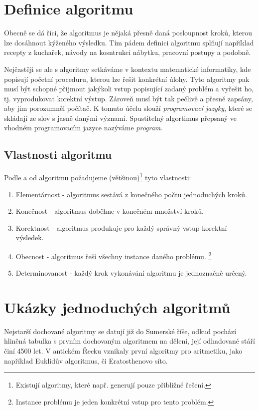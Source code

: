 \documentclass[12pt]{report}			%
\begin{document}
			\section{Definice algoritmu}
			Obecně se dá říci, že algoritmus je nějaká přesně daná posloupnost kroků, kterou lze dosáhnout kýženého výsledku. Tím pádem definici algoritmu splňují například recepty z kuchařek, návody na kosntrukci nábytku, pracovní postupy a podobně. \cite{neckar}
			
			
			Nejčastěji se ale s algoritmy setkáváme v kontextu matematické informatiky, kde popisují početní proceduru, kterou lze řešit konkrétní úlohy. Tyto algoritmy pak musí být schopné přijmout jakýkoli vstup popisující zadaný problém a vyřešit ho, tj. vyprodukovat korektní výstup. Zároveň musí být tak pečlivě a přesně zapsány, aby jim porozumněl počítač. K tomuto účelu slouží \emph{programovací jazyky}, které se skládají ze slov s jasně danými význami. Spustitelný algortimus přepsaný ve vhodném programovacím jazyce nazýváme \emph{program}. \cite{dvorsky} 
			
			\subsection{Vlastnosti algoritmu}
			Podle \cite{zaklady} a \cite{cerny} od algoritmu požadujeme (většinou)\footnote{Existují algoritmy, které např. generují pouze přibližné řešení.} tyto vlastnosti:
			\begin{enumerate}
				\item Elementárnost - algoritmus sestává z konečného počtu jednoduchých kroků.
				\item Konečnost - algoritmus doběhne v konečném množství kroků.
				\item Korektnost - algoritmus produkuje pro každý správný vstup korektní výsledek.
				\item Obecnost - algoritmus řeší všechny instance daného problému. \footnote{Instance problému je jeden konkrétní vstup pro tento problém.}
				\item Determinovanost - každý krok vykonávání algoritmu je jednoznačně určený.
				
				
			\end{enumerate} 
			
			
			\section{Ukázky jednoduchých algoritmů}
			Nejstarší dochované algoritmy se datují již do Sumerské říše, odkud pochází hliněná tabulka s prvním dochovaným algoritmem na dělení, její odhadované stáří činí 4500 let. V antickém Řecku vznikaly první algoritmy pro aritmetiku, jako například Euklidův algoritmus, či Eratosthenovo síto. \cite{history}
				
\end{document}
